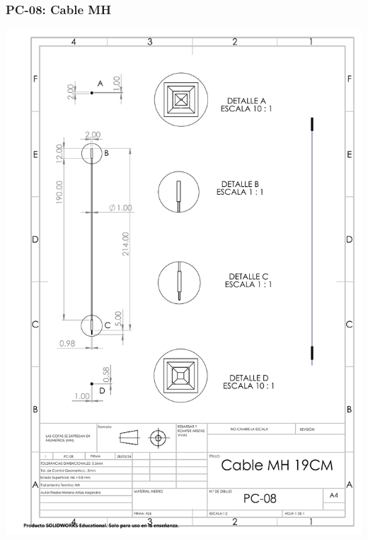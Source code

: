 \subsubsection{PC-08: Cable MH }
\begin{center}
\includegraphics[width=.85\textwidth]{22/img/cableMHDibujo.PDF}~\\[15cm]
\end{center}

